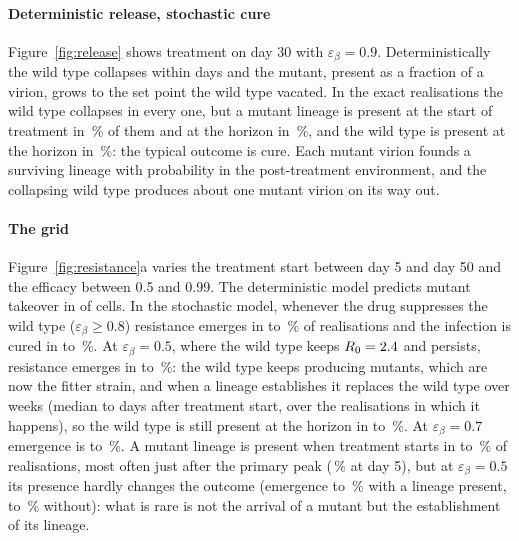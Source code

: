 \paragraph{Deterministic release, stochastic cure}
Figure~\ref{fig:release} shows treatment on day 30 with $\varepsilon_\beta = 0.9$. Deterministically the wild type collapses within days and the mutant, present as a fraction of a virion, grows to the set point the wild type vacated. In the \EnsembleN{} exact realisations the wild type collapses in every one, but a mutant lineage is present at the start of treatment in \EnsemblePreAtTreat\,\% of them and at the horizon in \EnsembleMutAtEnd\,\%, and the wild type is present at the horizon in \EnsembleWtAtEnd\,\%: the typical outcome is cure. Each mutant virion founds a surviving lineage with probability \MutVirionEstablish{} in the post-treatment environment, and the collapsing wild type produces about one mutant virion on its way out.

\paragraph{The grid}
Figure~\ref{fig:resistance}a varies the treatment start between day 5 and day 50 and the efficacy between 0.5 and 0.99. The deterministic model predicts mutant takeover in \OdeTakeoverCells{} of \ResCells{} cells. In the stochastic model, whenever the drug suppresses the wild type ($\varepsilon_\beta \ge 0.8$) resistance emerges in \EmergeSuppressedMin{} to \EmergeSuppressedMax\,\% of realisations and the infection is cured in \CureSuppressedMin{} to \CureSuppressedMax\,\%. At $\varepsilon_\beta = 0.5$, where the wild type keeps $R_0 = 2.4$ and persists, resistance emerges in \EmergeWeakMin{} to \EmergeWeakMax\,\%: the wild type keeps producing mutants, which are now the fitter strain, and when a lineage establishes it replaces the wild type over weeks (median \DominanceWeakMin{} to \DominanceWeakMax{} days after treatment start, over the realisations in which it happens), so the wild type is still present at the horizon in \WtHorizonWeakMin{} to \WtHorizonWeakMax\,\%. At $\varepsilon_\beta = 0.7$ emergence is \EmergeMidMin{} to \EmergeMidMax\,\%. A mutant lineage is present when treatment starts in \PreMin{} to \PreMax\,\% of realisations, most often just after the primary peak (\PreDayFive\,\% at day 5), but at $\varepsilon_\beta = 0.5$ its presence hardly changes the outcome (emergence \EmergeWeakPreMin{} to \EmergeWeakPreMax\,\% with a lineage present, \EmergeWeakDenovoMin{} to \EmergeWeakDenovoMax\,\% without): what is rare is not the arrival of a mutant but the establishment of its lineage.

